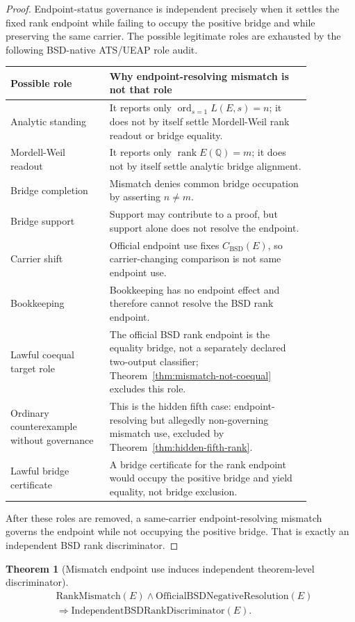 \documentclass[11pt]{article}
\newtheorem{theorem}{Theorem}[section]
\newcommand{\Q}{\mathbb{Q}}
\newcommand{\rank}{\operatorname{rank}}
\newcommand{\ord}{\operatorname{ord}}
\newcommand{\BSD}{\mathrm{BSD}}
\newcommand{\RankMismatch}{\mathrm{RankMismatch}}
\begin{document}
\begin{proof}
Endpoint-status governance is independent precisely when it settles the fixed rank endpoint while failing to occupy the positive bridge and while preserving the same carrier. The possible legitimate roles are exhausted by the following BSD-native ATS/UEAP role audit.
\begin{center}
\begin{tabular}{L{0.28\linewidth}L{0.58\linewidth}}
\toprule
\textbf{Possible role} & \textbf{Why endpoint-resolving mismatch is not that role}\\
\midrule
Analytic standing & It reports only $\ord_{s=1}L(E,s)=n$; it does not by itself settle Mordell-Weil rank readout or bridge equality.\\
Mordell-Weil readout & It reports only $\rank E(\Q)=m$; it does not by itself settle analytic bridge alignment.\\
Bridge completion & Mismatch denies common bridge occupation by asserting $n\neq m$.\\
Bridge support & Support may contribute to a proof, but support alone does not resolve the endpoint.\\
Carrier shift & Official endpoint use fixes $C_{\BSD}(E)$, so carrier-changing comparison is not same endpoint use.\\
Bookkeeping & Bookkeeping has no endpoint effect and therefore cannot resolve the BSD rank endpoint.\\
Lawful coequal target role & The official BSD rank endpoint is the equality bridge, not a separately declared two-output classifier; Theorem~\ref{thm:mismatch-not-coequal} excludes this role.\\
Ordinary counterexample without governance & This is the hidden fifth case: endpoint-resolving but allegedly non-governing mismatch use, excluded by Theorem~\ref{thm:hidden-fifth-rank}.\\
Lawful bridge certificate & A bridge certificate for the rank endpoint would occupy the positive bridge and yield equality, not bridge exclusion.\\
\bottomrule
\end{tabular}
\end{center}
After these roles are removed, a same-carrier endpoint-resolving mismatch governs the endpoint while not occupying the positive bridge. That is exactly an independent BSD rank discriminator.
\end{proof}

\begin{theorem}[Mismatch endpoint use induces independent theorem-level discriminator]\label{thm:mismatch-disc}
\[
\begin{aligned}
&\RankMismatch(E)\wedge \mathrm{OfficialBSDNegativeResolution}(E)\\
&\Rightarrow \mathrm{IndependentBSDRankDiscriminator}(E).
\end{aligned}
\]
\end{theorem}
\end{document}
